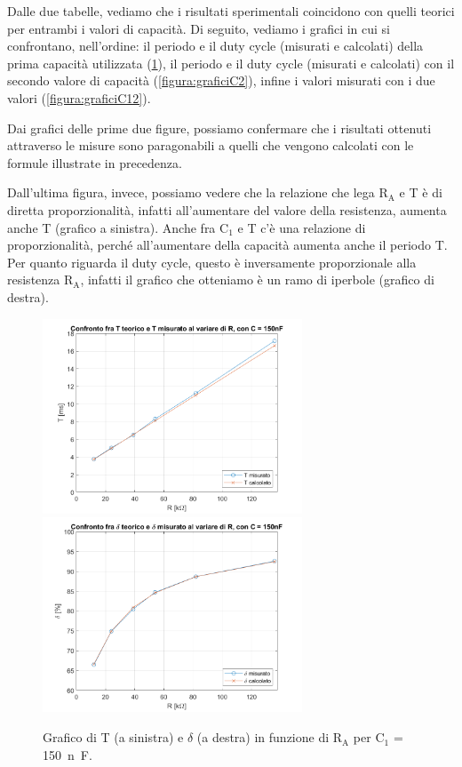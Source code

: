 \documentclass{report}
\begin{document}
\newpage
Dalle due tabelle, vediamo che i risultati sperimentali coincidono con quelli teorici per entrambi i valori di capacità. Di seguito, vediamo i grafici in cui si confrontano, nell'ordine: il periodo e il duty cycle (misurati e calcolati) della prima capacità utilizzata (\ref{figura:graficiC1}), il periodo e il duty cycle (misurati e calcolati) con il secondo valore di capacità (\ref{figura:graficiC2}), infine i valori misurati con i due valori (\ref{figura:graficiC12}).\par 
Dai grafici delle prime due figure, possiamo confermare che i risultati ottenuti attraverso le misure sono paragonabili a quelli che vengono calcolati con le formule illustrate in precedenza. \par
Dall'ultima figura, invece, possiamo vedere che la relazione che lega $\mathrm{R_A}$ e T è di diretta proporzionalità, infatti all'aumentare del valore della resistenza, aumenta anche T (grafico a sinistra). Anche fra $\mathrm{C_1}$ e T c'è una relazione di proporzionalità, perché all'aumentare della capacità aumenta anche il periodo T. Per quanto riguarda il duty cycle, questo è inversamente proporzionale alla resistenza $\mathrm{R_A}$, infatti il grafico che otteniamo è un ramo di iperbole (grafico di destra).
\begin{figure}[h!]
	\centering
	\includegraphics[height=5.8cm]{immagini/graficoT1}
	\includegraphics[height=5.8cm]{immagini/graficoDC1}
	\caption{Grafico di T (a sinistra) e $\delta$ (a destra) in funzione di $\mathrm{R_A}$ per $\mathrm{C_1}$ = \SI{150}{n\farad}.}
	\label{figura:graficiC1}
\end{figure}
\end{document}
